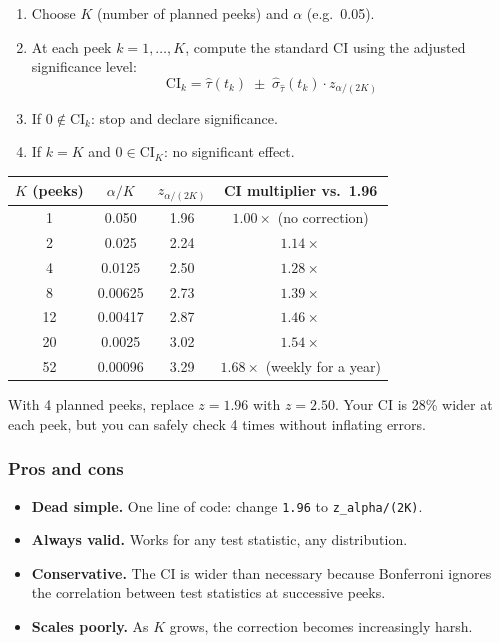 \documentclass[12pt, a4paper]{article}
\begin{document}
\begin{enumerate}[nosep]
  \item Choose $K$ (number of planned peeks) and $\alpha$ (e.g.\ 0.05).
  \item At each peek $k = 1, \ldots, K$, compute the standard CI using
        the adjusted significance level:
        \[
          \text{CI}_k = \hat{\tau}(t_k) \;\pm\;
          \hat{\sigma}_{\hat{\tau}}(t_k) \cdot z_{\alpha/(2K)}
        \]
  \item If $0 \notin \text{CI}_k$: stop and declare significance.
  \item If $k = K$ and $0 \in \text{CI}_K$: no significant effect.
\end{enumerate}

\begin{center}
\renewcommand{\arraystretch}{1.3}
\begin{tabular}{@{} c c c c @{}}
\toprule
$K$ (peeks) & $\alpha/K$ & $z_{\alpha/(2K)}$ & CI multiplier vs.\ 1.96 \\
\midrule
1  & 0.050  & 1.96 & $1.00\times$ (no correction) \\
2  & 0.025  & 2.24 & $1.14\times$ \\
4  & 0.0125 & 2.50 & $1.28\times$ \\
8  & 0.00625 & 2.73 & $1.39\times$ \\
12 & 0.00417 & 2.87 & $1.46\times$ \\
20 & 0.0025  & 3.02 & $1.54\times$ \\
52 & 0.00096 & 3.29 & $1.68\times$ (weekly for a year) \\
\bottomrule
\end{tabular}
\end{center}

\begin{plainlanguage}
With 4 planned peeks, replace $z = 1.96$ with $z = 2.50$.  Your CI is
28\% wider at each peek, but you can safely check 4 times without
inflating errors.
\end{plainlanguage}

\subsubsection*{Pros and cons}

\begin{itemize}[nosep]
  \item[\textcolor{green!60!black}{+}] \textbf{Dead simple.}  One line of
        code: change \texttt{1.96} to \texttt{z\_alpha/(2K)}.
  \item[\textcolor{green!60!black}{+}] \textbf{Always valid.}  Works for
        any test statistic, any distribution.
  \item[\textcolor{red}{--}] \textbf{Conservative.}  The CI is wider than
        necessary because Bonferroni ignores the correlation between test
        statistics at successive peeks.
  \item[\textcolor{red}{--}] \textbf{Scales poorly.}  As $K$ grows, the
        correction becomes increasingly harsh.
\end{itemize}
\end{document}
